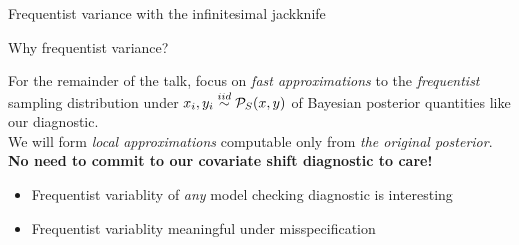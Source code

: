 

\begin{frame}[plain]
  \vfill
  \begin{block}{}
    \centering
    \Huge Frequentist variance with the infinitesimal jackknife
  \end{block}
  \vfill
\end{frame}




\begin{frame}{Why frequentist variance?}

For the remainder of the talk, focus on \emph{fast approximations} to the
\emph{frequentist} sampling distribution under
$x_i,y_i \overset{iid}{\sim} {{\mathcal{P}_{S}}}(x, y)$ of Bayesian posterior quantities like
our diagnostic.\\[1em]

We will form \emph{local approximations} computable only from 
\emph{the original posterior}.\\[1em]

\pause
\textbf{No need to commit to our covariate shift diagnostic to care!}

%
\begin{itemize}
\item Frequentist variablity of \emph{any} model checking diagnostic is interesting
\item Frequentist variablity meaningful under misspecification
  \parencite{huggins:2023:bayesbag,wang:2026:AccurateLargesampleUncertainty2026,
         luo:2026:RobustStandardErrors2026,ji:2025:ValidStandardErrors2025}
\end{itemize}
%


\end{frame}







